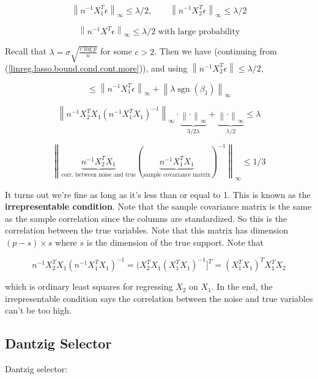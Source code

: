 \[
\left\lVert n^{-1} X_1^T \epsilon \right\rVert_\infty \leq \lambda/2, \qquad \left\lVert n^{-1} X_2^T \epsilon \right\rVert_\infty \leq \lambda/2
\]

\[
\left\lVert n^{-1} X^T \epsilon \right\rVert_\infty \leq \lambda/2 \text{ with large probability}
\]

Recall that \(\lambda = \sigma \sqrt{ \frac{c \log p }{n} } \) for some \(c >2\). Then we have (continuing from (\ref{linreg.lasso.bound.cond.cont.more})), and using \( \left\lVert n^{-1}X_2^T \epsilon \right\rVert \leq \lambda/2\), 

\[
\leq \left\lVert n^{-1} X_1^T \epsilon \right\rVert_\infty + \left\lVert \lambda \operatorname{sgn}(\beta_1)   \right\rVert_\infty
\]

\[
 \left\lVert n^{-1} X_2^T X_1(n^{-1}X_1^T X_1)^{-1} \right\rVert_\infty \cdot \underbrace{ \left\lVert \cdot \right\rVert_\infty}_{3/2 \lambda} + \underbrace{\left\lVert \cdot \right\rVert_\infty}_{\lambda/2} \leq \lambda
\]

\begin{equation}\label{linreg.lasso.irrep}
 \left\lVert \underbrace{n^{-1} X_2^T X_1}_{\text{corr. between noise and true}}( \underbrace{n^{-1}X_1^T X_1}_{\text{sample covariance matrix}})^{-1} \right\rVert_\infty  \leq 1/3
\end{equation}

It turns out we're fine as long as it's less than or equal to 1. This is known as the \textbf{irrepresentable condition}. Note that the sample covariance matrix is the same as the sample correlation since the columns are standardized. So this is the correlation between the true variables. Note that this matrix has dimension \((p-s) \times s\) where \(s\) is the dimension of the true support. Note that

\[
n^{-1} X_2^T X_1( n^{-1}X_1^T X_1)^{-1} = (X_2^T X_1 (X_1^T X_1)^{-1}]^T =(X_1^T X_1)^T X_1^T X_2
 \]
 
which is ordinary least squares for regressing \(X_2\) on \(X_1\). In the end, the irrepresentable condition says the correlation between the noise and true variables can't be too high.

\subsection{Dantzig Selector}

Dantzig selector:


